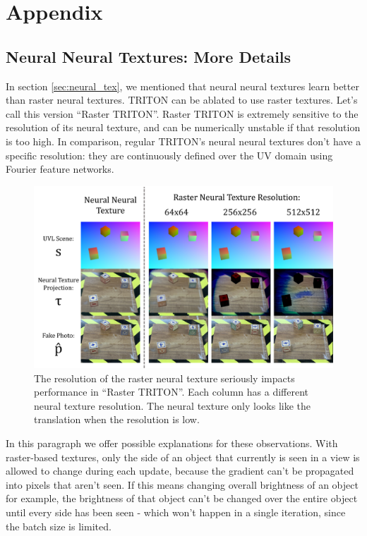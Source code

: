 \section{Appendix} 

\subsection{Neural Neural Textures: More Details}

	In section \ref{sec:neural_tex}, we mentioned that neural neural textures learn better than raster neural textures. 
	TRITON can be ablated to use raster textures. Let's call this version ``Raster TRITON''. 
	Raster TRITON is extremely sensitive to the resolution of its neural texture, and can be numerically unstable if that resolution is too high.
	In comparison, regular TRITON's neural neural textures don't have a specific resolution: they are continuously defined over the UV domain using Fourier feature networks.

	\begin{figure}[H]
		\begin{center}
			\includegraphics[width=400pt]{../images/raster_texture_resolution_comparisons.pdf}
		\end{center}
		\caption{
			The resolution of the raster neural texture seriously impacts performance in ``Raster TRITON''. Each column has a different neural texture resolution.
			The neural texture only looks like the translation when the resolution is low.
		}
		\label{fig:raster_texture_resolution_comparisons}
	\end{figure}

	In this paragraph we offer possible explanations for these observations.
	With raster-based textures, only the side of an object that currently is seen in a view is allowed to change during each update, because the gradient can't be propagated into pixels that aren't seen.
	If this means changing overall brightness of an object for example, the brightness of that object can't be changed over the entire object until every side has been seen - which won't happen in a single iteration, since the batch size is limited.

